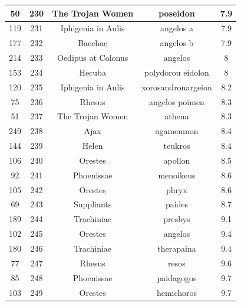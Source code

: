 \documentclass{jcls}
\begin{document}
\begin{longtable}{|c|c|c|c|c|}
  50 & 230 & The Trojan Women & poseidon & 7.9 \\ \hline
  119 & 231 & Iphigenia in Aulis & angelos a & 7.9 \\ \hline
  177 & 232 & Bacchae & angelos b & 7.9 \\ \hline
  214 & 233 & Oedipus at Colonus & angelos & 8 \\ \hline
  153 & 234 & Hecuba & polydorou eidolon & 8 \\ \hline
  120 & 235 & Iphigenia in Aulis & xorosandronargeion & 8.2 \\ \hline
  75 & 236 & Rhesus & angelos poimen & 8.3 \\ \hline
  51 & 237 & The Trojan Women & athena & 8.3 \\ \hline
  249 & 238 & Ajax & agamemnon & 8.4 \\ \hline
  144 & 239 & Helen & teukros & 8.4 \\ \hline
  106 & 240 & Orestes & apollon & 8.5 \\ \hline
  92 & 241 & Phoenissae & menoikeus & 8.6 \\ \hline
  105 & 242 & Orestes & phryx & 8.6 \\ \hline
  69 & 243 & Suppliants & paides & 8.7 \\ \hline
  189 & 244 & Trachiniae & presbys & 9.1 \\ \hline
  102 & 245 & Orestes & angelos & 9.4 \\ \hline
  180 & 246 & Trachiniae & therapaina & 9.4 \\ \hline
  77 & 247 & Rhesus & resos & 9.6 \\ \hline
  85 & 248 & Phoenissae & paidagogos & 9.7 \\ \hline
  103 & 249 & Orestes & hemichoros & 9.7 \\ \hline
\end{longtable}

%
%
%
\end{document}

